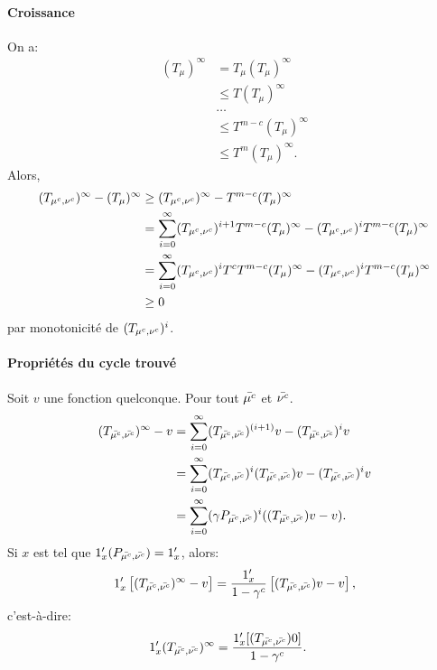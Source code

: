 \documentclass{article}
\begin{document}
\paragraph{Croissance}
On a:
\begin{align}
  (T_\mu)^\infty & = T_\mu (T_\mu)^\infty \\
  & \le T (T_\mu)^\infty \\
  & \dots \\
  &  \le T^{m-c} (T_\mu)^\infty \\
  & \le T^m (T_\mu)^\infty.
\end{align}
Alors,
\begin{align}
  ( T_{\mu^c,\nu^c} )^\infty -  (T_\mu)^\infty &\ge  ( T_{\mu^c,\nu^c} )^\infty - T^{m-c} (T_{\mu})^\infty \\
  & =  \sum_{i=0}^{\infty} ( T_{\mu^c,\nu^c} )^{i+1} T^{m-c} (T_{\mu})^\infty - ( T_{\mu^c,\nu^c} )^{i} T^{m-c} (T_{\mu})^\infty \\
  & = \sum_{i=0}^{\infty} ( T_{\mu^c,\nu^c} )^{i} T^c T^{m-c} (T_{\mu})^\infty - ( T_{\mu^c,\nu^c} )^{i} T^{m-c} (T_{\mu})^\infty \\
  & \ge 0
\end{align}
par monotonicité de $( T_{\mu^c,\nu^c} )^{i}$.


\paragraph{Propriétés du cycle trouvé}


Soit $v$ une fonction quelconque. Pour tout $\bar{\mu^c}$ et $\bar{\nu^c}$. 
\begin{align}
  (T_{\bar\muc,\bar\nuc})^\infty - v %
  & =\sum_{i=0}^{\infty} (T_{\bar\muc,\bar\nuc})^{(i+1)} v - (T_{\bar\muc,\bar\nuc})^{i} v\\
  & = \sum_{i=0}^{\infty} (T_{\bar\muc,\bar\nuc})^{i} (T_{\bar\muc,\bar\nuc}) v - (T_{\bar\muc,\bar\nuc})^{i} v \\
  & = \sum_{i=0}^{\infty} (\gamma P_{\bar\muc,\bar\nuc})^{i}  ( (T_{\bar\muc,\bar\nuc}) v  - v).
\end{align}
Si $x$ est tel que $1_x' (P_{\bar{\mu^c},\bar{\nu^c}}) = 1_x'$, alors:
\begin{align}
  1_x' \left[ (T_{\bar{\mu^c},\bar{\nu^c}})^\infty - v \right] & = \frac{1_x'}{1-\gamma^c}  \left[ (T_{\bar{\mu^c},\bar{\nu^c}}) v - v \right], \\
\end{align}
c'est-à-dire:
\begin{align}
 1_x' (T_{\bar{\mu^c},\bar{\nu^c}})^\infty & = \frac{  1_x' [(T_{\bar{\mu^c},\bar{\nu^c}}) 0 ] }{1-\gamma^c}.
\end{align}
\end{document}
